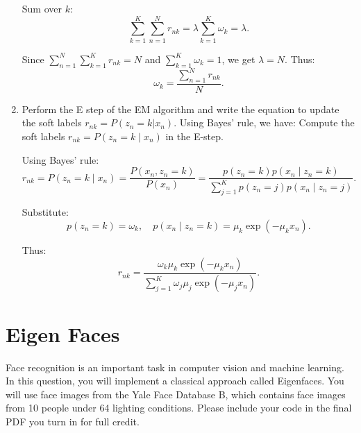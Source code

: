\documentclass[a3paper,12pt]{extarticle} %
\begin{document}
\begin{enumerate}
   Sum over $k$:
   \[
   \sum_{k=1}^K \sum_{n=1}^N r_{nk} = \lambda \sum_{k=1}^K \omega_k = \lambda.
   \]
   
   Since $\sum_{n=1}^N \sum_{k=1}^K r_{nk} = N$ and $\sum_{k=1}^K \omega_k = 1$, we get $\lambda = N$. Thus:
   \[
   \omega_k = \frac{\sum_{n=1}^N r_{nk}}{N}.
   \]
    \item Perform the E step of the EM algorithm and write the equation to update the soft labels $r_{nk} = P(z_n = k|x_n)$. Using Bayes' rule, we have:
    Compute the soft labels $r_{nk} = P(z_n = k \mid x_n)$ in the E-step.

Using Bayes' rule:
\[
r_{nk} = P(z_n = k \mid x_n) = \frac{P(x_n, z_n = k)}{P(x_n)} = \frac{p(z_n = k) p(x_n \mid z_n = k)}{\sum_{j=1}^K p(z_n = j) p(x_n \mid z_n = j)}.
\]

Substitute:
\[
p(z_n = k) = \omega_k, \quad p(x_n \mid z_n = k) = \mu_k \exp(-\mu_k x_n).
\]

Thus:
\[
r_{nk} = \frac{\omega_k \mu_k \exp(-\mu_k x_n)}{\sum_{j=1}^K \omega_j \mu_j \exp(-\mu_j x_n)}.
\]
\end{enumerate}

\newpage
\section{Eigen Faces}
Face recognition is an important task in computer vision and machine learning. In this question, you will
implement a classical approach called Eigenfaces. You will use face images from the Yale Face Database
B, which contains face images from 10 people under 64 lighting conditions. Please include your code in
the final PDF you turn in for full credit.
\end{document}
